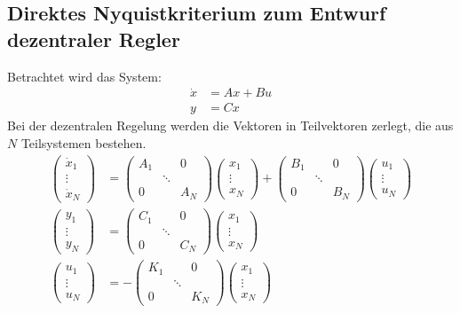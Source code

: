 \documentclass[a4paper,twocolumn,10pt]{article}
\begin{document}
\subsection{Direktes Nyquistkriterium zum Entwurf dezentraler Regler}
Betrachtet wird das System:
\begin{align*}
\dot{x}&=Ax+Bu\\
y&=Cx
\end{align*}
Bei der dezentralen Regelung werden die Vektoren in Teilvektoren zerlegt, die aus $N$ Teilsystemen bestehen.
\begin{align*}
\begin{pmatrix}\dot{x}_1 \\ \vdots \\ \dot{x}_N\end{pmatrix}&=\begin{pmatrix}A_1 & & 0 \\ & \ddots & \\ 0 & & A_N\end{pmatrix}\begin{pmatrix}x_1 \\ \vdots \\ x_N\end{pmatrix}+\begin{pmatrix}B_1 & & 0 \\ & \ddots & \\ 0 & & B_N\end{pmatrix}\begin{pmatrix}u_1 \\ \vdots \\ u_N\end{pmatrix}\\
\begin{pmatrix}y_1 \\ \vdots \\ y_N\end{pmatrix}&=\begin{pmatrix}C_1 & & 0 \\ & \ddots & \\ 0 & & C_N\end{pmatrix}\begin{pmatrix}x_1 \\ \vdots \\ x_N\end{pmatrix}\\
\begin{pmatrix}u_1 \\ \vdots \\ u_N\end{pmatrix}&=-\begin{pmatrix}K_1 & & 0 \\ & \ddots & \\ 0 & & K_N\end{pmatrix}\begin{pmatrix}x_1 \\ \vdots \\ x_N\end{pmatrix}
\end{align*}
\end{document}
